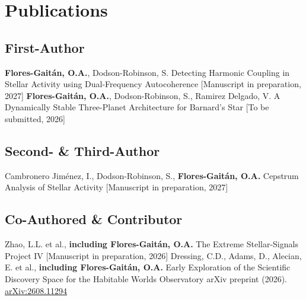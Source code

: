 \section{Publications}

\subsection*{First-Author}
\begin{onecolentry}
\begin{etaremune}
    \resumePubEntry
        {\textbf{Flores-Gaitán, O.A.}, Dodson-Robinson, S.}
        {Detecting Harmonic Coupling in Stellar Activity using Dual-Frequency Autocoherence}
        {[Manuscript in preparation, 2027]}
    \resumePubEntry
        {\textbf{Flores-Gaitán, O.A.}, Dodson-Robinson, S., Ramirez Delgado, V.}
        {A Dynamically Stable Three-Planet Architecture for Barnard's Star}
        {[To be submitted, 2026]}
\end{etaremune}
\end{onecolentry}

\vspace{0.10cm}

\subsection*{Second- \& Third-Author}
\begin{onecolentry}
\begin{etaremune}
    \resumePubEntry
        {Cambronero Jiménez, I., Dodson-Robinson, S., \textbf{Flores-Gaitán, O.A.}}
        {Cepstrum Analysis of Stellar Activity}
        {[Manuscript in preparation, 2027]}
\end{etaremune}
\end{onecolentry}

\vspace{0.10cm}

\subsection*{Co-Authored \& Contributor}
\begin{onecolentry}
\begin{etaremune}
    \resumePubEntry
        {Zhao, L.L. et al., \textbf{including Flores-Gaitán, O.A.}}
        {The Extreme Stellar-Signals Project IV}
        {[Manuscript in preparation, 2026]}
    \resumePubEntry
        {Dressing, C.D., Adams, D., Alecian, E.  et al., \textbf{including Flores-Gaitán, O.A.}}
        {Early Exploration of the Scientific Discovery Space for the Habitable Worlds Observatory}
        {arXiv preprint (2026). \href{https://arxiv.org/abs/2608.11294}{arXiv:2608.11294}}
\end{etaremune}
\end{onecolentry}

